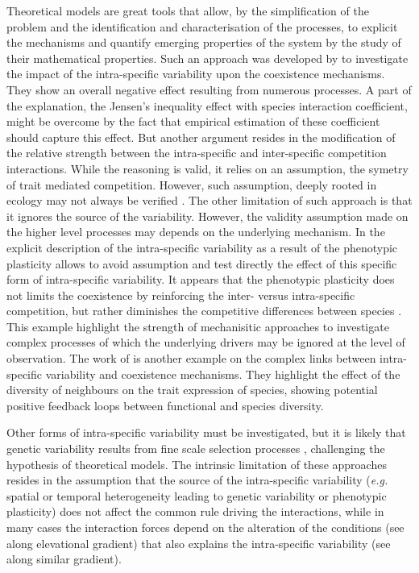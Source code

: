 Theoretical models are great tools that allow, by the simplification of the problem and the identification and characterisation of the processes, to explicit the mechanisms and quantify emerging properties of the system by the study of their mathematical properties. Such an approach was developed by \citet{hart_how_2016} to investigate the impact of the intra-specific variability upon the coexistence mechanisms. They show an overall negative effect resulting from numerous processes. A part of the explanation, the Jensen's inequality effect with species interaction coefficient, might be overcome by the fact that empirical estimation of these coefficient should capture this effect. But another argument resides in the modification of the relative strength between the intra-specific and inter-specific competition interactions. While the reasoning is valid, it relies on an assumption, the symetry of trait mediated competition. However, such assumption, deeply rooted in ecology \parencite{macarthur_limiting_1967} may not always be verified  \parencite{kunstler_plant_2016}. The other limitation of such approach is that it ignores the source of the variability. However, the validity assumption made on the higher level processes may depends on the underlying mechanism. In \model the explicit description of the intra-specific variability as a result of the phenotypic plasticity allows to avoid assumption and test directly the effect of this specific form of intra-specific variability. It appears that the phenotypic plasticity does not limits the coexistence by reinforcing the inter- versus intra-specific competition, but rather diminishes the competitive differences between species . This example highlight the strength of mechanisitic approaches to investigate complex processes of which the underlying drivers may be ignored at the level of observation. The work of \citet{zuppinger-dingley_selection_2014} is another example on the complex links between intra-specific variability and coexistence mechanisms. They highlight the effect of the diversity of neighbours on the trait expression of species, showing potential positive feedback loops between functional and species diversity.

Other forms of intra-specific variability must be investigated, but it is likely that genetic variability results from fine scale selection processes \parencite{hamann_evidence_2016}, challenging the hypothesis of theoretical models. The intrinsic limitation of these approaches resides in the assumption that the source of the intra-specific variability (\textit{e.g.} spatial or temporal heterogeneity leading to genetic variability or phenotypic plasticity) does not affect the common rule driving the interactions, while in many cases the interaction forces depend on the alteration of the conditions (see \citet{choler_facilitation_2001} along elevational gradient) that also explains the intra-specific variability (see \citet{kichenin_contrasting_2013} along similar gradient).

